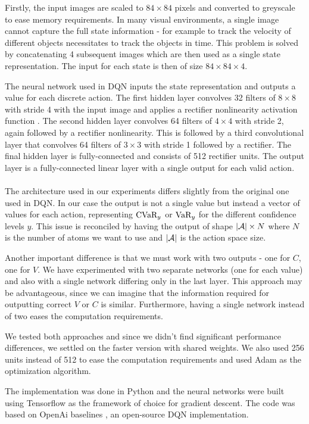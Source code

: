 Firstly, the input images are scaled to $84\times84$ pixels and converted to greyscale to ease memory requirements. In many visual environments, a single image cannot capture the full state information - for example to track the velocity of different objects necessitates to track the objects in time. This problem is solved by concatenating 4 subsequent images which are then used as a single state representation. The input for each state is then of size $84\times84\times4$.

The neural network used in DQN inputs the state representation and outputs a value for each discrete action. The first hidden layer convolves 32 filters of $8\times8$ with stride 4 with the input image and applies a rectifier nonlinearity activation function \citep{jarrett2009best}. The second hidden layer convolves 64 filters of $4\times4$ with stride 2, again followed by a rectifier nonlinearity. This is followed by a third convolutional layer that convolves 64 filters of $3\times3$ with stride 1 followed by a rectifier. The final hidden layer is fully-connected and consists of 512 rectifier units. The output layer is a fully-connected linear layer with a single output for each valid action.
\\
\\
The architecture used in our experiments differs slightly from the original one used in DQN. In our case the output is not a single value but instead a vector of values for each action, representing $\text{CVaR}_y$ or $\text{VaR}_y$ for the different confidence levels $y$. This issue is reconciled by having the output of shape $|\mathcal{A}|\times N$ where $N$ is the number of atoms we want to use and $|\mathcal{A}|$ is the action space size.

Another important difference is that we must work with two outputs - one for $C$, one for $V$. We have experimented with two separate networks (one for each value) and also with a single network differing only in the last layer. This approach may be advantageous, since we can imagine that the information required for outputting correct $V$ or $C$ is similar. Furthermore, having a single network instead of two eases the computation requirements.

We tested both approaches and since we didn't find significant performance differences, we settled on the faster version with shared weights. We also used 256 units instead of 512 to ease the computation requirements and used Adam \citep{kingma2014adam} as the optimization algorithm.

The implementation was done in Python and the neural networks were built using Tensorflow \citep{abadi2016tensorflow} as the framework of choice for gradient descent. The code was based on OpenAi baselines \citep{baselines}, an open-source DQN implementation.


